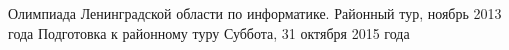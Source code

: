 

\contest
{Олимпиада Ленинградской области по информатике. Районный тур, ноябрь 2013 года}
{Подготовка к районному туру}
{Суббота, 31 октября 2015 года}




\raggedbottom

\def\newpageafterlegend{\relax}
\newpage
{}
\newpage
{}
\newpage
{}
\newpage
{}


